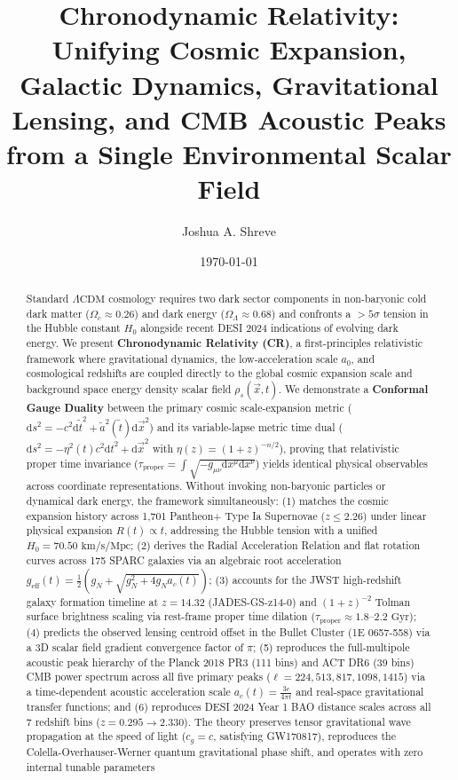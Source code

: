 \documentclass[aps,prd,reprint,superscriptaddress,nofootinbib,floatfix,amsmath,amssymb]{revtex4-2}
\begin{document}
\title{Chronodynamic Relativity: Unifying Cosmic Expansion, Galactic Dynamics, Gravitational Lensing, and CMB Acoustic Peaks from a Single Environmental Scalar Field}

\author{Joshua A. Shreve}

\date{\today}

\begin{abstract}
Standard $\Lambda\text{CDM}$ cosmology requires two dark sector components in non-baryonic cold dark matter ($\Omega_c \approx 0.26$) and dark energy ($\Omega_\Lambda \approx 0.68$) and confronts a $>5\sigma$ tension in the Hubble constant $H_0$ alongside recent DESI 2024 indications of evolving dark energy. We present \textbf{Chronodynamic Relativity (CR)}, a first-principles relativistic framework where gravitational dynamics, the low-acceleration scale $a_0$, and cosmological redshifts are coupled directly to the global cosmic expansion scale and background space energy density scalar field $\rho_s(\vec{x}, t)$. We demonstrate a \textbf{Conformal Gauge Duality} between the primary cosmic scale-expansion metric ($\mathrm{d}s^2 = -c^2 \mathrm{d}\tilde{t}^2 + \tilde{a}^2(\tilde{t})\mathrm{d}\vec{x}^2$) and its variable-lapse metric time dual ($\mathrm{d}s^2 = -\eta^2(t) c^2 \mathrm{d}t^2 + \mathrm{d}\vec{x}^2$ with $\eta(z) = (1+z)^{-n/2}$), proving that relativistic proper time invariance ($\tau_{\mathrm{proper}} = \int \sqrt{-g_{\mu\nu}\mathrm{d}x^\mu\mathrm{d}x^\nu}$) yields identical physical observables across coordinate representations. Without invoking non-baryonic particles or dynamical dark energy, the framework simultaneously: (1) matches the cosmic expansion history across 1,701 Pantheon+ Type Ia Supernovae ($z \le 2.26$) under linear physical expansion $R(t) \propto t$, addressing the Hubble tension with a unified $H_0 = 70.50\text{ km/s/Mpc}$; (2) derives the Radial Acceleration Relation and flat rotation curves across 175 SPARC galaxies via an algebraic root acceleration $g_{\text{eff}}(t) = \frac{1}{2}(g_N + \sqrt{g_N^2 + 4 g_N a_c(t)})$; (3) accounts for the JWST high-redshift galaxy formation timeline at $z = 14.32$ (JADES-GS-z14-0) and $(1+z)^{-2}$ Tolman surface brightness scaling via rest-frame proper time dilation ($\tau_{\mathrm{proper}} \approx 1.8\text{--}2.2\text{ Gyr}$); (4) predicts the observed lensing centroid offset in the Bullet Cluster (1E 0657-558) via a 3D scalar field gradient convergence factor of $\pi$; (5) reproduces the full-multipole acoustic peak hierarchy of the Planck 2018 PR3 (111 bins) and ACT DR6 (39 bins) CMB power spectrum across all five primary peaks ($\ell = 224, 513, 817, 1098, 1415$) via a time-dependent acoustic acceleration scale $a_c(t) = \frac{3 c}{4\pi t}$ and real-space gravitational transfer functions; and (6) reproduces DESI 2024 Year 1 BAO distance scales across all 7 redshift bins ($z=0.295 \to 2.330$). The theory preserves tensor gravitational wave propagation at the speed of light ($c_g = c$, satisfying GW170817), reproduces the Colella-Overhauser-Werner quantum gravitational phase shift, and operates with zero internal tunable parameters 
\end{abstract}
\end{document}

